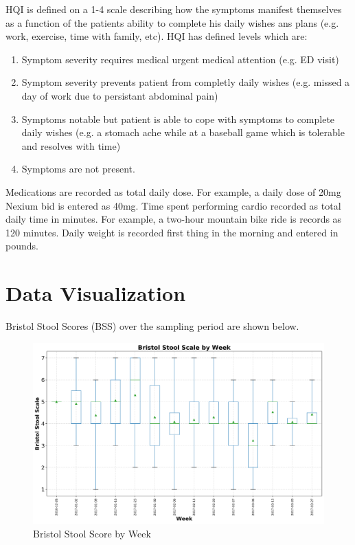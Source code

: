 \documentclass[conference]{IEEEtran}
\begin{document}
HQI is defined on a 1-4 scale describing how the symptoms manifest themselves as a function of the patients ability to complete his daily wishes ans plans (e.g. work, exercise, time with family, etc).  HQI has defined levels which are:

\begin{enumerate}
  \item Symptom severity requires medical urgent medical attention (e.g. ED visit)
  \item Symptom severity prevents patient from completly daily wishes (e.g. missed a day of work due to persistant abdominal pain)
  \item Symptoms notable but patient is able to cope with symptoms to complete daily wishes (e.g. a stomach ache while at a baseball game which is tolerable and resolves with time)
  \item Symptoms are not present.
\end{enumerate}

Medications are recorded as total daily dose.  For example, a daily dose of 20mg Nexium bid is entered as 40mg. Time spent performing cardio recorded as total daily time in minutes.  For example, a two-hour mountain bike ride is records as 120 minutes. Daily weight is recorded first thing in the morning and entered in pounds.

\section{Data Visualization}

Bristol Stool Scores (BSS) over the sampling period are shown below.

\begin{figure}[t]
    \centering
    \includegraphics[width=\columnwidth]{bss_box_whisker.png}
    \caption{Bristol Stool Score by Week}\label{fig:bss_box_whisker}
\end{figure}
\end{document}
